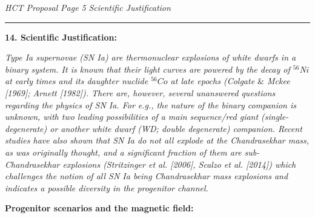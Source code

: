 \documentclass[11pt]{article}
\begin{document}
\newpage
{\it HCT Proposal}\hskip 5cm {\it Page 5} \hfill {\it Scientific Justification}\\[1mm]
\hrule
{\bf 14. Scientific Justification:} {\sl Type Ia supernovae (SN Ia) are thermonuclear explosions of white dwarfs in a binary system.  It is known that their light curves are powered by the decay of $^{56}$Ni at early times and its daughter nuclide $^{56}Co$ at late epochs (Colgate $\&$ Mckee [1969]; Arnett [1982]).  There are, however, several unanswered questions regarding the physics of SN Ia. For e.g., the nature of the binary companion is unknown, with two leading possibilities of a main sequence/red giant (single-degenerate) or another white dwarf (WD; double degenerate) companion. Recent studies have also shown that SN Ia do not all explode at the Chandrasekhar mass, as was originally thought, and a significant fraction of them are sub-Chandrasekhar explosions (Stritzinger et al. [2006], Scalzo et al. [2014]) which challenges the notion of all SN Ia being Chandrasekhar mass explosions and indicates a possible diversity in the progenitor channel.    %

\textbf{Progenitor scenarios and the magnetic field:}

}
\end{document}
